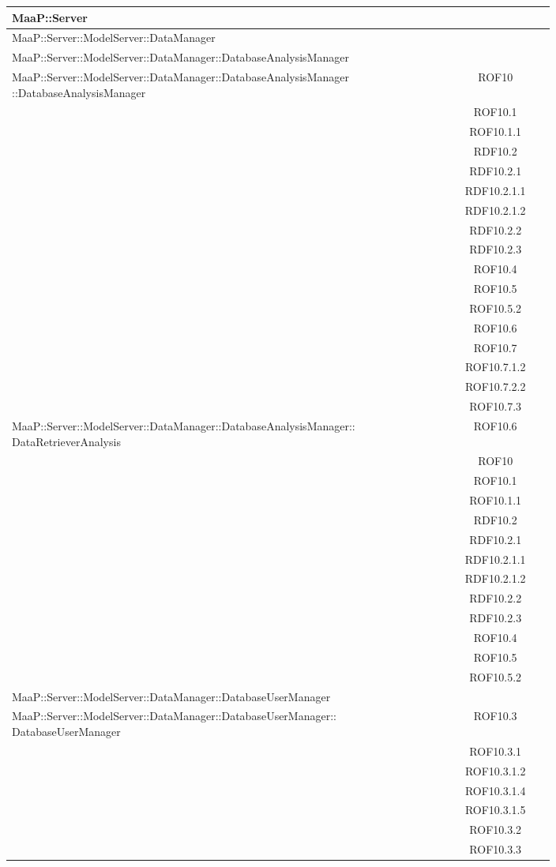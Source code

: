 \begin{center}
\begin{longtable}{|p{0.8\linewidth}|c|}
\midrule 
MaaP::Server
& \\

\midrule 
MaaP::Server::ModelServer::DataManager 
& \\

\midrule
MaaP::Server::ModelServer::DataManager::DatabaseAnalysisManager 
& \\

\midrule 
MaaP::Server::ModelServer::DataManager::DatabaseAnalysisManager ::DatabaseAnalysisManager
& ROF10\\
& ROF10.1\\
& ROF10.1.1\\ 
& RDF10.2\\
& RDF10.2.1\\
& RDF10.2.1.1\\
& RDF10.2.1.2\\
& RDF10.2.2\\
& RDF10.2.3\\
& ROF10.4\\
& ROF10.5\\
& ROF10.5.2\\
& ROF10.6\\
& ROF10.7\\
& ROF10.7.1.2\\
& ROF10.7.2.2\\
& ROF10.7.3\\

\midrule
MaaP::Server::ModelServer::DataManager::DatabaseAnalysisManager:: DataRetrieverAnalysis
& ROF10.6\\ 
& ROF10\\
& ROF10.1\\
& ROF10.1.1\\
& RDF10.2\\
& RDF10.2.1\\
& RDF10.2.1.1\\
& RDF10.2.1.2\\
& RDF10.2.2\\
& RDF10.2.3\\
& ROF10.4\\
& ROF10.5\\
& ROF10.5.2\\

\midrule 
MaaP::Server::ModelServer::DataManager::DatabaseUserManager 
& \\

\midrule 
MaaP::Server::ModelServer::DataManager::DatabaseUserManager:: DatabaseUserManager
& ROF10.3\\
& ROF10.3.1\\
& ROF10.3.1.2\\
& ROF10.3.1.4\\
& ROF10.3.1.5\\
& ROF10.3.2\\
& ROF10.3.3\\



\end{longtable}
\end{center}

